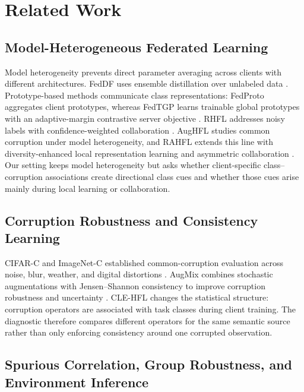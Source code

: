 \section{Related Work}

\subsection{Model-Heterogeneous Federated Learning}

Model heterogeneity prevents direct parameter averaging across clients with different architectures. FedDF uses ensemble distillation over unlabeled data \citep{lin2020feddf}. Prototype-based methods communicate class representations: FedProto aggregates client prototypes, whereas FedTGP learns trainable global prototypes with an adaptive-margin contrastive server objective \citep{tan2022fedproto,zhang2024fedtgp}. RHFL addresses noisy labels with confidence-weighted collaboration \citep{fang2022rhfl}. AugHFL studies common corruption under model heterogeneity, and RAHFL extends this line with diversity-enhanced local representation learning and asymmetric collaboration \citep{fang2023aughfl,fang2025rahfl}. Our setting keeps model heterogeneity but asks whether client-specific class--corruption associations create directional class cues and whether those cues arise mainly during local learning or collaboration.

\subsection{Corruption Robustness and Consistency Learning}

CIFAR-C and ImageNet-C established common-corruption evaluation across noise, blur, weather, and digital distortions \citep{hendrycks2019corruptions}. AugMix combines stochastic augmentations with Jensen--Shannon consistency to improve corruption robustness and uncertainty \citep{cubuk2020augmix}. CLE-HFL changes the statistical structure: corruption operators are associated with task classes during client training. The diagnostic therefore compares different operators for the same semantic source rather than only enforcing consistency around one corrupted observation.

\subsection{Spurious Correlation, Group Robustness, and Environment Inference}

